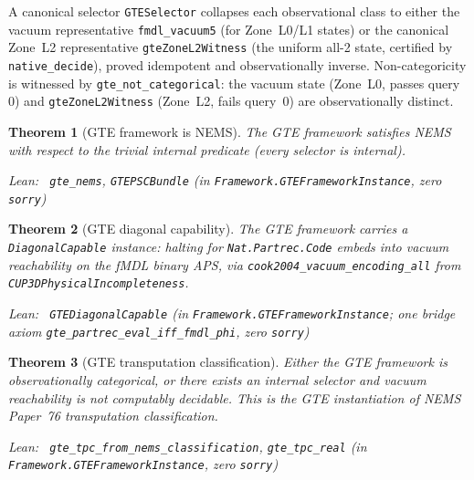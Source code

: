 \documentclass[11pt,a4paper]{article}
\newenvironment{leanref}%
  {\par\smallskip\noindent\begingroup\raggedright\textup{Lean:}~}%
  {\par\endgroup}
\newtheorem{theorem}{Theorem}[section]
\theoremstyle{definition}
\begin{document}
A canonical selector \lstinline|GTESelector| collapses each observational class to
either the vacuum representative \lstinline|fmdl_vacuum5| (for Zone~L0/L1 states)
or the canonical Zone~L2 representative \lstinline|gteZoneL2Witness| (the uniform
all-2 state, certified by \lstinline|native_decide|), proved idempotent and
observationally inverse.
Non-categoricity is witnessed by \lstinline|gte_not_categorical|: the vacuum state
(Zone~L0, passes query~$0$) and \lstinline|gteZoneL2Witness| (Zone~L2, fails
query~$0$) are observationally distinct.

\begin{theorem}[GTE framework is NEMS]\label{thm:gte-nems}
The GTE framework satisfies NEMS with respect to the trivial internal predicate
(every selector is internal).

\begin{leanref}
\lstinline|gte_nems|, \lstinline|GTEPSCBundle|
\textup{(in \texttt{Framework.GTEFrameworkInstance}, zero \texttt{sorry})}
\end{leanref}
\end{theorem}

\begin{theorem}[GTE diagonal capability]\label{thm:gte-diagonal}
The GTE framework carries a \texttt{DiagonalCapable} instance: halting for
\texttt{Nat.Partrec.Code} embeds into vacuum reachability on the fMDL binary APS,
via \lstinline|cook2004_vacuum_encoding_all| from
\texttt{CUP3DPhysicalIncompleteness}.

\begin{leanref}
\lstinline|GTEDiagonalCapable|
\textup{(in \texttt{Framework.GTEFrameworkInstance}; one bridge axiom
\lstinline|gte_partrec_eval_iff_fmdl_phi|, zero \texttt{sorry})}
\end{leanref}
\end{theorem}

\begin{theorem}[GTE transputation classification]\label{thm:gte-tpc}
Either the GTE framework is observationally categorical, or there exists an
internal selector and vacuum reachability is not computably decidable.
This is the GTE instantiation of NEMS Paper~76 transputation classification.

\begin{leanref}
\lstinline|gte_tpc_from_nems_classification|, \lstinline|gte_tpc_real|
\textup{(in \texttt{Framework.GTEFrameworkInstance}, zero \texttt{sorry})}
\end{leanref}
\end{theorem}
\end{document}

